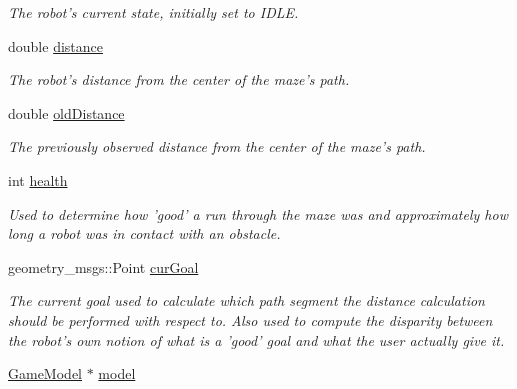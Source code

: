 \begin{DoxyCompactItemize}
\begin{DoxyCompactList}\small\item\em The robot's current state, initially set to I\-D\-L\-E. \end{DoxyCompactList}\item 
\hypertarget{classRobot_abab25b958f5f0f7af339fa82d638fadd}{double \hyperlink{classRobot_abab25b958f5f0f7af339fa82d638fadd}{distance}}\label{classRobot_abab25b958f5f0f7af339fa82d638fadd}

\begin{DoxyCompactList}\small\item\em The robot's distance from the center of the maze's path. \end{DoxyCompactList}\item 
\hypertarget{classRobot_a136a992d1133de166a0a4da2f53040a8}{double \hyperlink{classRobot_a136a992d1133de166a0a4da2f53040a8}{old\-Distance}}\label{classRobot_a136a992d1133de166a0a4da2f53040a8}

\begin{DoxyCompactList}\small\item\em The previously observed distance from the center of the maze's path. \end{DoxyCompactList}\item 
\hypertarget{classRobot_a78e4e81aa68993d79f98d44bf5cdfc10}{int \hyperlink{classRobot_a78e4e81aa68993d79f98d44bf5cdfc10}{health}}\label{classRobot_a78e4e81aa68993d79f98d44bf5cdfc10}

\begin{DoxyCompactList}\small\item\em Used to determine how 'good' a run through the maze was and approximately how long a robot was in contact with an obstacle. \end{DoxyCompactList}\item 
\hypertarget{classRobot_a00aea3ad13ecc05e0e2dad5b2afe7be1}{geometry\-\_\-msgs\-::\-Point \hyperlink{classRobot_a00aea3ad13ecc05e0e2dad5b2afe7be1}{cur\-Goal}}\label{classRobot_a00aea3ad13ecc05e0e2dad5b2afe7be1}

\begin{DoxyCompactList}\small\item\em The current goal used to calculate which path segment the distance calculation should be performed with respect to. Also used to compute the disparity between the robot's own notion of what is a 'good' goal and what the user actually give it. \end{DoxyCompactList}\item 
\hypertarget{classRobot_a09f1ce763b2ee67d35b91c89892decc2}{\hyperlink{classGameModel}{Game\-Model} $\ast$ \hyperlink{classRobot_a09f1ce763b2ee67d35b91c89892decc2}{model}}\label{classRobot_a09f1ce763b2ee67d35b91c89892decc2}


\end{DoxyCompactItemize}
